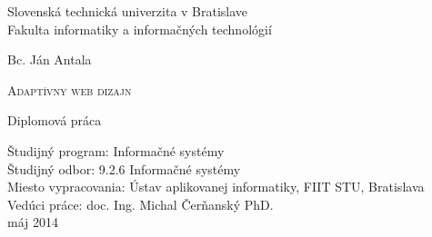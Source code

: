 

\setlength{\parindent}{0cm}

\thispagestyle{empty}

\begin{center}
\begin{LARGE}
\textmd{
Slovenská technická univerzita v Bratislave\\
\vspace*{0.2cm}
Fakulta informatiky a informačných technológií  
}
\end{LARGE}

\vspace*{1.0cm}
\begin{Large}
\end{Large}

\end{center}

\vspace{5.5cm}

\begin{center}
{\Large \textmd{{Bc. Ján Antala}}}
\end{center}

\vspace{0.1cm}
\begin{huge}
\begin{center}
\textsc{Adaptívny web dizajn}
\end{center}
\end{huge}

\vspace{0.5cm}
\begin{center}
{\Large{\textmd{Diplomová práca}}}\\
\end{center}

\vspace{5.5cm}

\begin{flushleft}
\large{Študijný program: Informačné systémy} \\
\large{Študijný odbor: 9.2.6 Informačné systémy} \\
\large{Miesto vypracovania:  Ústav aplikovanej informatiky, FIIT STU, Bratislava} \\
\large{Vedúci práce: doc. Ing. Michal Čerňanský PhD.} \\
\vspace{1.0cm}
\large{máj 2014} \\
\end{flushleft}


